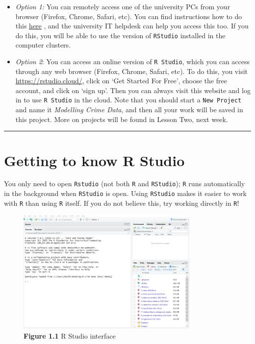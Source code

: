 \documentclass[
]{book}
\begin{document}
\begin{itemize}
\item
  \emph{Option 1:} You can remotely access one of the university PCs from your browser (Firefox, Chrome, Safari, etc). You can find instructions how to do this \href{https://www.itservices.manchester.ac.uk/students/pc-on-campus/remote-cluster-access/}{here} , and the university IT helpdesk can help you access this too. If you do this, you will be able to use the version of \texttt{RStudio} installed in the computer clusters.
\item
  \emph{Option 2}: You can access an online version of \texttt{R\ Studio}, which you can access through any web browser (Firefox, Chrome, Safari, etc). To do this, you visit \url{https://rstudio.cloud/}, click on `Get Started For Free', choose the free account, and click on `sign up'. Then you can always visit this website and log in to use \texttt{R\ Studio} in the cloud. Note that you should start a \texttt{New\ Project} and name it \emph{Modelling Crime Data}, and then all your work will be saved in this project. More on projects will be found in Lesson Two, next week.
\end{itemize}

\begin{center}\rule{0.5\linewidth}{0.5pt}\end{center}

\hypertarget{getting-to-know-r-studio}{%
\section{Getting to know R Studio}\label{getting-to-know-r-studio}}

You only need to open \texttt{Rstudio} (not both \texttt{R} and \texttt{RStudio}); \texttt{R} runs automatically in the background when \texttt{RStudio} is open. Using \texttt{RStudio} makes it easier to work with \texttt{R} than using \texttt{R} itself. If you do not believe this, try working directly in \texttt{R}!

\begin{figure}
\centering
\includegraphics[width=0.8\textwidth,height=\textheight]{Images/rstudio1.png}
\caption{\textbf{Figure 1.1} R Studio interface}
\end{figure}
\end{document}
